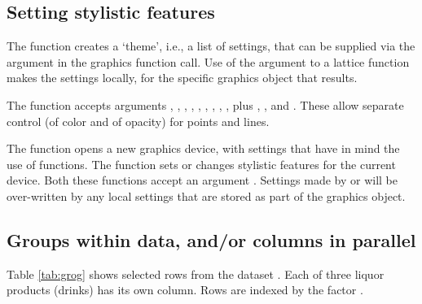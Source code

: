 \subsection{Setting stylistic features}\label{ss:style}

The function  creates a `theme', i.e., a list of
settings, that can be supplied via the argument  in
the graphics function call.  Use of the argument 
to a lattice function makes the settings locally, for the specific
graphics object that results.

The 
function  accepts arguments ,
, , , , ,
, , , plus ,
,  and .  These
allow separate control (of color and of opacity) for points and lines.

The function  opens a new graphics device, with
settings that have in mind the use of  functions. The
function  sets or changes stylistic features
for the current device. Both these functions accept an argument
.  Settings made by
 or  will be
over-written by any local settings that are stored as part of the
graphics object.

\subsection{Groups within data, and/or columns in parallel}\label{ss:grog}

Table \ref{tab:grog} shows selected rows from the dataset 
. Each of three liquor products (drinks) has
its own column. Rows are indexed by the factor .

